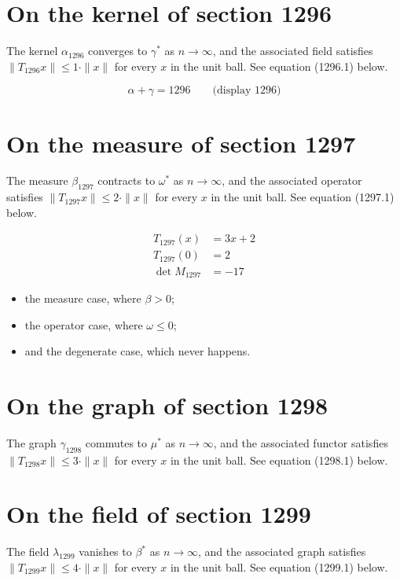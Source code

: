 \documentclass{article}
\begin{document}
\section{On the kernel of section 1296}
The kernel $\alpha_{1296}$ converges to $\gamma^{*}$ as $n \to \infty$,
and the associated field satisfies $\|T_{1296} x\| \leq 1 \cdot \|x\|$
for every $x$ in the unit ball. See equation (1296.1) below.

$$
\alpha + \gamma = 1296 \qquad \text{(display 1296)}
$$

\section{On the measure of section 1297}
The measure $\beta_{1297}$ contracts to $\omega^{*}$ as $n \to \infty$,
and the associated operator satisfies $\|T_{1297} x\| \leq 2 \cdot \|x\|$
for every $x$ in the unit ball. See equation (1297.1) below.

\begin{align}
T_{1297}(x) &= 3 x + 2 \\
T_{1297}(0) &= 2 \\
\det M_{1297} &= -17
\end{align}

\begin{itemize}
  \item the measure case, where $\beta > 0$;
  \item the operator case, where $\omega \leq 0$;
  \item and the degenerate case, which never happens.
\end{itemize}

\section{On the graph of section 1298}
The graph $\gamma_{1298}$ commutes to $\mu^{*}$ as $n \to \infty$,
and the associated functor satisfies $\|T_{1298} x\| \leq 3 \cdot \|x\|$
for every $x$ in the unit ball. See equation (1298.1) below.

\section{On the field of section 1299}
The field $\lambda_{1299}$ vanishes to $\beta^{*}$ as $n \to \infty$,
and the associated graph satisfies $\|T_{1299} x\| \leq 4 \cdot \|x\|$
for every $x$ in the unit ball. See equation (1299.1) below.
\end{document}
